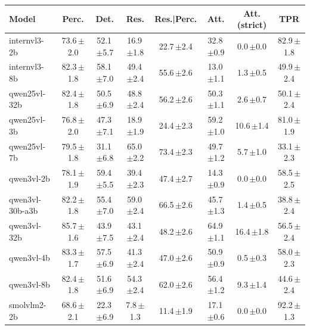 \begin{tabular}{lccccccc}
\toprule
Model & Perc. & Det. & Res. & Res.|Perc. & Att. & Att.(strict) & TPR \\
\midrule
internvl3-2b & 73.6\,{\scriptsize$\pm$2.0} & 52.1\,{\scriptsize$\pm$5.7} & 16.9\,{\scriptsize$\pm$1.8} & 22.7\,{\scriptsize$\pm$2.4} & 32.8\,{\scriptsize$\pm$0.9} & 0.0\,{\scriptsize$\pm$0.0} & 82.9\,{\scriptsize$\pm$1.8} \\
internvl3-8b & 82.3\,{\scriptsize$\pm$1.8} & 58.1\,{\scriptsize$\pm$7.0} & 49.4\,{\scriptsize$\pm$2.4} & 55.6\,{\scriptsize$\pm$2.6} & 13.0\,{\scriptsize$\pm$1.1} & 1.3\,{\scriptsize$\pm$0.5} & 49.9\,{\scriptsize$\pm$2.4} \\
qwen25vl-32b & 82.4\,{\scriptsize$\pm$1.8} & 50.5\,{\scriptsize$\pm$6.9} & 48.8\,{\scriptsize$\pm$2.4} & 56.2\,{\scriptsize$\pm$2.6} & 50.3\,{\scriptsize$\pm$1.1} & 2.6\,{\scriptsize$\pm$0.7} & 50.1\,{\scriptsize$\pm$2.4} \\
qwen25vl-3b & 76.8\,{\scriptsize$\pm$2.0} & 47.3\,{\scriptsize$\pm$7.1} & 18.9\,{\scriptsize$\pm$1.9} & 24.4\,{\scriptsize$\pm$2.3} & 59.2\,{\scriptsize$\pm$1.0} & 10.6\,{\scriptsize$\pm$1.4} & 81.0\,{\scriptsize$\pm$1.9} \\
qwen25vl-7b & 79.5\,{\scriptsize$\pm$1.8} & 31.1\,{\scriptsize$\pm$6.8} & 65.0\,{\scriptsize$\pm$2.2} & 73.4\,{\scriptsize$\pm$2.3} & 49.7\,{\scriptsize$\pm$1.2} & 5.7\,{\scriptsize$\pm$1.0} & 33.1\,{\scriptsize$\pm$2.3} \\
qwen3vl-2b & 78.1\,{\scriptsize$\pm$1.9} & 59.4\,{\scriptsize$\pm$5.5} & 39.4\,{\scriptsize$\pm$2.3} & 47.4\,{\scriptsize$\pm$2.7} & 14.3\,{\scriptsize$\pm$0.9} & 0.0\,{\scriptsize$\pm$0.0} & 58.5\,{\scriptsize$\pm$2.5} \\
qwen3vl-30b-a3b & 82.2\,{\scriptsize$\pm$1.8} & 55.4\,{\scriptsize$\pm$7.0} & 59.0\,{\scriptsize$\pm$2.4} & 66.5\,{\scriptsize$\pm$2.6} & 45.7\,{\scriptsize$\pm$1.3} & 1.4\,{\scriptsize$\pm$0.5} & 38.8\,{\scriptsize$\pm$2.4} \\
qwen3vl-32b & 85.7\,{\scriptsize$\pm$1.6} & 43.9\,{\scriptsize$\pm$7.5} & 43.1\,{\scriptsize$\pm$2.4} & 48.2\,{\scriptsize$\pm$2.6} & 64.9\,{\scriptsize$\pm$1.1} & 16.4\,{\scriptsize$\pm$1.8} & 56.5\,{\scriptsize$\pm$2.4} \\
qwen3vl-4b & 83.3\,{\scriptsize$\pm$1.7} & 57.5\,{\scriptsize$\pm$6.9} & 41.3\,{\scriptsize$\pm$2.4} & 47.0\,{\scriptsize$\pm$2.6} & 50.9\,{\scriptsize$\pm$0.9} & 0.5\,{\scriptsize$\pm$0.3} & 58.0\,{\scriptsize$\pm$2.3} \\
qwen3vl-8b & 82.4\,{\scriptsize$\pm$1.8} & 51.6\,{\scriptsize$\pm$6.9} & 54.3\,{\scriptsize$\pm$2.4} & 62.0\,{\scriptsize$\pm$2.6} & 56.4\,{\scriptsize$\pm$1.2} & 9.3\,{\scriptsize$\pm$1.4} & 44.6\,{\scriptsize$\pm$2.4} \\
smolvlm2-2b & 68.6\,{\scriptsize$\pm$2.1} & 22.3\,{\scriptsize$\pm$6.9} & 7.8\,{\scriptsize$\pm$1.3} & 11.4\,{\scriptsize$\pm$1.9} & 17.1\,{\scriptsize$\pm$0.6} & 0.0\,{\scriptsize$\pm$0.0} & 92.2\,{\scriptsize$\pm$1.3} \\
\bottomrule
\end{tabular}
